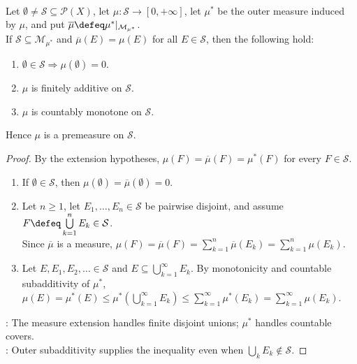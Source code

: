 \begin{proposition} \label{prop:extension-forces-family-premeasure} \\
Let $\emptyset\neq\mathcal{S}\subseteq\mathcal{P}(X)$, let $\mu:\mathcal{S}\to[0,+\infty]$, let $\mu^\ast$ be the outer measure induced by $\mu$, and put $\overline{\mu}\defeq\mu^\ast|_{\mathcal{M}_{\mu^\ast}}$.\\
If $\mathcal{S}\subseteq\mathcal{M}_{\mu^\ast}$ and $\overline{\mu}(E)=\mu(E)$ for all $E\in\mathcal{S}$, then the following hold:
\begin{enumerate}[label=(\roman*)]
\setlength{\itemsep}{0pt}
\item $\emptyset\in\mathcal{S}\Rightarrow\mu(\emptyset)=0$.
\item $\mu$ is finitely additive on $\mathcal{S}$.
\item $\mu$ is countably monotone on $\mathcal{S}$.
\end{enumerate}
Hence $\mu$ is a premeasure on $\mathcal{S}$.
\begin{proof}
By the extension hypotheses, $\mu(F)=\overline{\mu}(F)=\mu^\ast(F)$ for every $F\in\mathcal{S}$.
\begin{enumerate}[label=(\roman*)]
\setlength{\itemsep}{0pt}
\item If $\emptyset\in\mathcal{S}$, then $\mu(\emptyset)=\overline{\mu}(\emptyset)=0$.
\item Let $n\geq1$, let $E_1,\ldots,E_n\in\mathcal{S}$ be pairwise disjoint, and assume $F\defeq\bigcup\limits_{k=1}^{n}E_k\in\mathcal{S}$.\\
Since $\overline{\mu}$ is a measure, $\mu(F)=\overline{\mu}(F)=\sum\limits_{k=1}^{n}\overline{\mu}(E_k)=\sum\limits_{k=1}^{n}\mu(E_k)$.
\item Let $E,E_1,E_2,\ldots\in\mathcal{S}$ and $E\subseteq\bigcup\limits_{k=1}^{\infty}E_k$. By monotonicity and countable subadditivity of $\mu^\ast$,\\
$\mu(E)=\mu^\ast(E)\leq\mu^\ast(\bigcup\limits_{k=1}^{\infty}E_k)\leq\sum\limits_{k=1}^{\infty}\mu^\ast(E_k)=\sum\limits_{k=1}^{\infty}\mu(E_k)$.
\end{enumerate}
: The measure extension handles finite disjoint unions; $\mu^\ast$ handles countable covers.\\
: Outer subadditivity supplies the inequality even when $\bigcup\limits_kE_k\notin\mathcal{S}$.
\end{proof}
\end{proposition}

